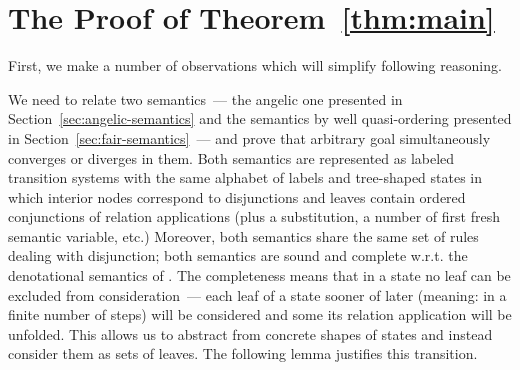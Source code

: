 \appendix

\section{The Proof of Theorem~\ref{thm:main}}
\label{sec:app}

First, we make a number of observations which will simplify following reasoning.

We need to relate two semantics~--- the angelic one presented in Section~\ref{sec:angelic-semantics} and
the semantics by well quasi-ordering presented in Section~\ref{sec:fair-semantics}~--- and prove that
arbitrary goal simultaneously converges or diverges in them. Both semantics are represented
as labeled transition systems with the same alphabet of labels and tree-shaped states in which interior
nodes correspond to disjunctions and leaves contain ordered conjunctions of relation applications (plus a
substitution, a number of first fresh semantic variable, etc.) Moreover, both semantics share the same
set of rules dealing with disjunction; both semantics are sound and complete w.r.t. the denotational
semantics of \mk. The completeness means that in a state no leaf can be excluded from consideration~---
each leaf of a state sooner of later (meaning: in a finite number of steps) will be considered and some
its relation application will be unfolded. This allows us to abstract from concrete shapes of states and
instead consider them as sets of leaves. The following lemma justifies this transition.

